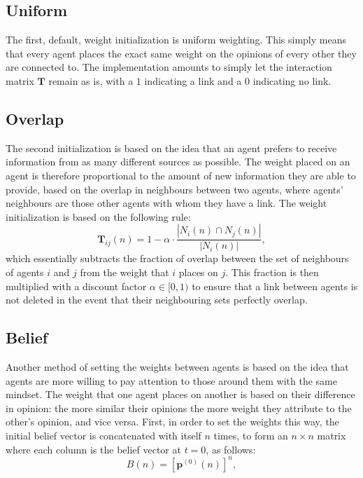 \documentclass{article}
\newcommand{\T}{\textbf{T}}
\begin{document}
\subsection{Uniform}

The first, default, weight initialization is uniform weighting. This simply means that every agent places the exact same weight on the opinions of every other they are connected to. The implementation amounts to simply let the interaction matrix $\T$ remain as is, with a $1$ indicating a link and a $0$ indicating no link.

\subsection{Overlap}

The second initialization is based on the idea that an agent prefers to receive information from as many different sources as possible. The weight placed on an agent is therefore proportional to the amount of new information they are able to provide, based on the overlap in neighbours between two agents, where agents' neighbours are those other agents with whom they have a link. The weight initialization is based on the following rule:
\begin{equation*}
    \T_{ij}(n) = 1 - \alpha \cdot \frac{|N_i(n) \cap N_j(n)|}{|N_i(n)|},
\end{equation*}
which essentially subtracts the fraction of overlap between the set of neighbours of agents $i$ and $j$ from the weight that $i$ places on $j$. This fraction is then multiplied with a discount factor $\alpha \in [0, 1)$ to ensure that a link between agents is not deleted in the event that their neighbouring sets perfectly overlap. 

\subsection{Belief}

Another method of setting the weights between agents is based on the idea that agents are more willing to pay attention to those around them with the same mindset. The weight that one agent places on another is based on their difference in opinion: the more similar their opinions the more weight they attribute to the other's opinion, and vice versa. First, in order to set the weights this way, the initial belief vector is concatenated with itself $n$ times, to form an $n \times n$ matrix where each column is the belief vector at $t=0$, as follows:
\begin{equation}
    B(n) = [\textbf{p}^{(0)}(n)]^{n},
\end{equation}
\end{document}
